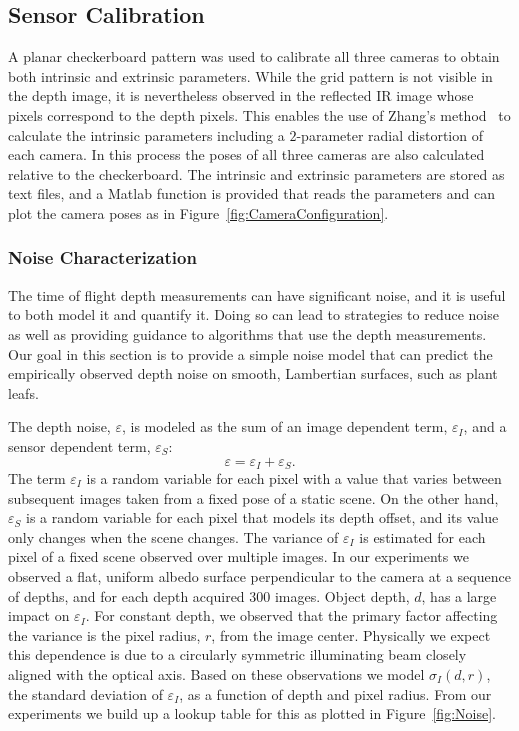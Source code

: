 

\subsection{Sensor Calibration}

A planar checkerboard pattern was used to calibrate all three cameras to obtain both intrinsic and extrinsic parameters. While the grid pattern is not visible in the depth image, it is nevertheless observed in the reflected IR image whose pixels correspond to the depth pixels. This enables the use of Zhang's method~\cite{Zhang2000} to calculate the intrinsic parameters including a $2$-parameter radial distortion of each camera. In this process the poses of all three cameras are also calculated relative to the checkerboard. The intrinsic and extrinsic parameters are stored as text files, and a Matlab function is provided that reads the parameters and can plot the camera poses as in Figure~\ref{fig:CameraConfiguration}.


\subsubsection{Noise Characterization}
\label{sec:bias}

The time of flight depth measurements can have significant noise, and it is useful to both model it and quantify it. Doing so can lead to strategies to reduce noise as well as providing guidance to algorithms that use the depth measurements. Our goal in this section is to provide a simple noise model that can predict the empirically observed depth noise on smooth, Lambertian surfaces, such as plant leafs.

The depth noise, $\varepsilon$, is modeled as the sum of an image dependent term, $\varepsilon_I$, and a sensor dependent term, $\varepsilon_S$:
\begin{equation}
\varepsilon = \varepsilon_I + \varepsilon_S. \label{eq:epsilon}
\end{equation}
The term $\varepsilon_I$ is a random variable for each pixel with a value that varies between subsequent images taken from a fixed pose of a static scene.  On the other hand, $\varepsilon_S$ is a random variable for each pixel that models its depth offset, and its value only changes when the scene changes.  The variance of $\varepsilon_I$ is estimated for each pixel of a fixed scene observed over multiple images. In our experiments we observed a flat, uniform albedo surface perpendicular to the camera at a sequence of depths, and for each depth acquired 300 images. Object depth, $d$, has a large impact on $\varepsilon_I$. For constant depth, we observed that the primary factor affecting the variance is the pixel radius, $r$, from the image center. Physically we expect this dependence is due to a circularly symmetric illuminating beam closely aligned with the optical axis. Based on these observations we model $\sigma_I(d,r)$, the standard deviation of $\varepsilon_I$, as a function of depth and pixel radius.  From our experiments we build up a lookup table for this as plotted in Figure~\ref{fig:Noise}.

